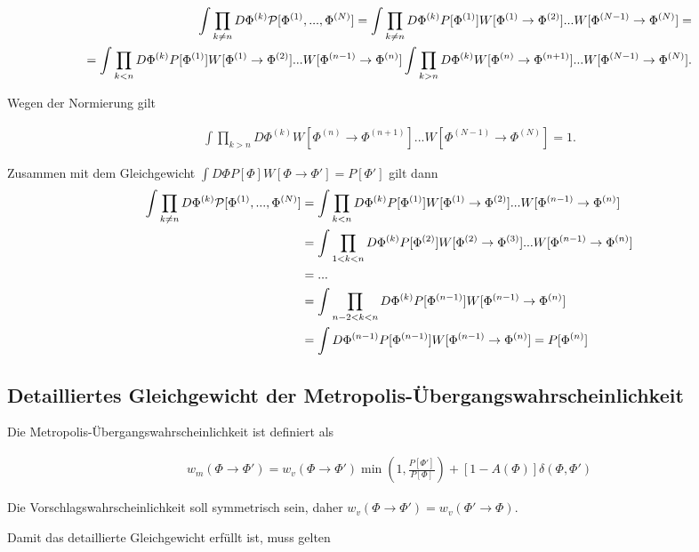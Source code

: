 \documentclass[10pt,a4paper]{article}
\begin{document}
 \begin{align*}
	\int \prod_{k\neq n} D\Phi^{(k)} {\cal P}[\Phi^{(1)},...,\Phi^{(N)}] = \int \prod_{k\neq n} D\Phi^{(k)}P[\Phi^{(1)}] W[\Phi^{(1)}\to \Phi^{(2)}]...W[\Phi^{(N-1)}\to \Phi^{(N)}]= \\
	=\int \prod_{k <  n} D\Phi^{(k)}P[\Phi^{(1)}] W[\Phi^{(1)}\to \Phi^{(2)}]...W[\Phi^{(n-1)}\to \Phi^{(n)}] \int \prod_{k > n} D\Phi^{(k)} W[\Phi^{(n)}\to \Phi^{(n+1)}]...W[\Phi^{(N-1)}\to \Phi^{(N)}].
 \end{align*}

Wegen der Normierung gilt

 \begin{align*}
	\int \prod_{k > n} D\Phi^{(k)} W[\Phi^{(n)}\to \Phi^{(n+1)}]...W[\Phi^{(N-1)}\to \Phi^{(N)}]=1.
 \end{align*}

Zusammen mit dem Gleichgewicht $\int D\Phi P[\Phi] W[\Phi\to \Phi'] = P[\Phi']$ gilt dann
 \begin{align*}
      \int \prod_{k\neq n} D\Phi^{(k)} {\cal P}[\Phi^{(1)},...,\Phi^{(N)}] &= \int \prod_{k <  n} D\Phi^{(k)}P[\Phi^{(1)}] W[\Phi^{(1)}\to \Phi^{(2)}]...W[\Phi^{(n-1)}\to \Phi^{(n)}] \\
&=\int \prod_{1 < k <  n} D\Phi^{(k)}P[\Phi^{(2)}] W[\Phi^{(2)}\to \Phi^{(3)}]...W[\Phi^{(n-1)}\to \Phi^{(n)}]\\
&= ...\\
&=\int \prod_{n-2 < k <  n} D\Phi^{(k)}P[\Phi^{(n-1)}] W[\Phi^{(n-1)}\to \Phi^{(n)}] \\
&=\int  D\Phi^{(n-1)}P[\Phi^{(n-1)}] W[\Phi^{(n-1)}\to \Phi^{(n)}] = P[\Phi^{(n)}]
 \end{align*}

\subsection{Detailliertes Gleichgewicht der Metropolis-Übergangswahrscheinlichkeit}
Die Metropolis-Übergangswahrscheinlichkeit ist definiert als

\begin{align*}
	w_m(\Phi\to\Phi') = w_v(\Phi\to\Phi') \min \left(1,\frac{P[\Phi']}{P[\Phi]}\right) + [1-A(\Phi)]\delta(\Phi,\Phi')
\end{align*}

Die Vorschlagswahrscheinlichkeit soll symmetrisch sein, daher $w_v(\Phi\to\Phi')=w_v(\Phi'\to\Phi)$.

Damit das detaillierte Gleichgewicht erfüllt ist, muss gelten
\end{document}
